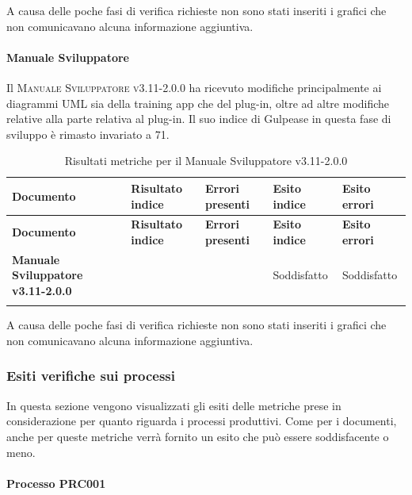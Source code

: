 A causa delle poche fasi di verifica richieste non sono stati inseriti i grafici che non comunicavano alcuna informazione aggiuntiva.

\paragraph{Manuale Sviluppatore}
\label{sub:manuale_sviluppatore}
Il \textsc{Manuale Sviluppatore v3.11-2.0.0} ha ricevuto modifiche principalmente ai diagrammi UML sia della training app che del plug-in, oltre ad altre modifiche relative alla parte relativa al plug-in.
Il suo indice di Gulpease in questa fase di sviluppo è rimasto invariato a 71.

\renewcommand{\arraystretch}{2} %
\begin{longtable}[H]{>{\centering\bfseries}m{6cm} >{\centering}m{2cm} >{\centering}m{2.5cm} >{\centering}m{2.5cm} >{\centering\arraybackslash}m{2.5cm}}  
  \rowcolor{lightgray}
  {\textbf{Documento}} & {\textbf{Risultato indice}} & {\textbf{Errori presenti}} & {\textbf{Esito indice}} & {\textbf{Esito errori}}  \\
  \endfirsthead%
  \rowcolor{lightgray}
  {\textbf{Documento}} & {\textbf{Risultato indice}} & {\textbf{Errori presenti}} & {\textbf{Esito indice}} & {\textbf{Esito errori}}  \\
  \endhead%
  \textbf{Manuale Sviluppatore v3.11-2.0.0} & 71               & 0               & Soddisfatto & Soddisfatto \\
  \caption{Risultati metriche per il Manuale Sviluppatore v3.11-2.0.0}
  \label{tab:my-table}
\end{longtable}

A causa delle poche fasi di verifica richieste non sono stati inseriti i grafici che non comunicavano alcuna informazione aggiuntiva.

\subsubsection{Esiti verifiche sui processi}
\label{sub:esiti_verifiche_sui_processi}
In questa sezione vengono visualizzati gli esiti delle metriche prese in considerazione per quanto riguarda i processi produttivi.
Come per i documenti, anche per queste metriche verrà fornito un esito che può essere soddisfacente o meno.

\paragraph{Processo PRC001}
\label{sub:processo_PRC001}

